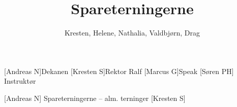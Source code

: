 \documentclass[a4paper,12pt]{article}
\title{Spareterningerne}
\author{Kresten, Helene, Nathalia, Valdbjørn, Drag}
\begin{document}
\maketitle




\begin{roles}
	[Andreas N]Dekanen
	[Kresten S]Rektor Ralf
	[Marcus G]Speak
	[Søren PH] Instruktør
\end{roles}


\begin{props}
	[Andreas N] Spareterningerne -- alm. terninger
	[Kresten S]
\end{props}
\end{document}
